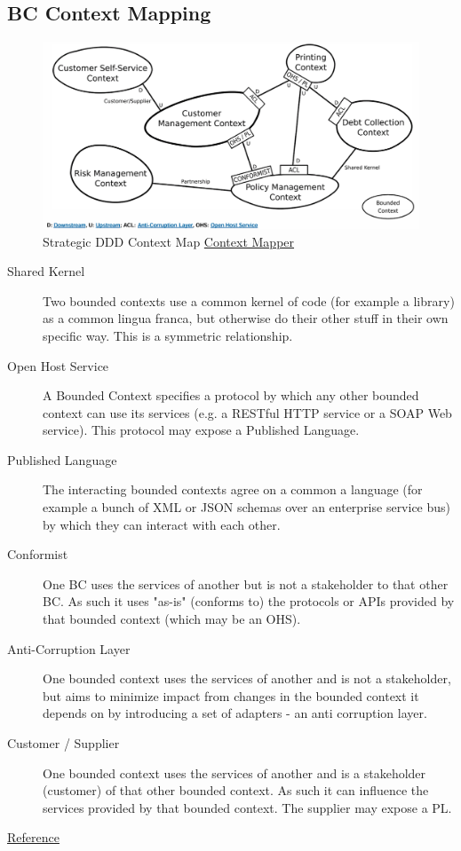 \documentclass[../Main.tex]{subfiles}
\begin{document}
\subsection{BC Context Mapping}
\begin{figure}[H]
    \centering
    \includegraphics[width=0.75\linewidth]{Images/bc-context-map.png}
    \caption{Strategic DDD Context Map \href{https://contextmapper.org/docs/examples/}{Context Mapper}}
\end{figure}

\begin{description}
    \item[Shared Kernel] Two bounded contexts use a common kernel of code (for example a library) as a common lingua
    franca, but otherwise do their other stuff in their own specific way. This is a symmetric relationship.
    \item[Open Host Service] A Bounded Context specifies a protocol by which any other bounded context can use its services (e.g. 
    a RESTful HTTP service or a SOAP Web service). This protocol may expose a Published Language.
    \item[Published Language] The interacting bounded contexts agree on a common a language (for example a bunch of XML or 
    JSON schemas over an enterprise service bus) by which they can interact with each other.
    \item[Conformist] One BC uses the services of another but is not a stakeholder to that other BC. As such it uses "as-is" 
    (conforms to) the protocols or APIs provided by that bounded context (which may be an OHS).
    \item[Anti-Corruption Layer] One bounded context uses the services of another and is not a stakeholder, but aims to minimize 
    impact from changes in the bounded context it depends on by introducing a set of adapters - an anti
    corruption layer.
    \item[Customer / Supplier] One bounded context uses the services of another and is a stakeholder (customer) of that other 
    bounded context. As such it can influence the services provided by that bounded context. The supplier 
    may expose a PL.
\end{description}
\href{https://www.methodsandtools.com/archive/archive.php?id=97}{Reference}
\end{document}
